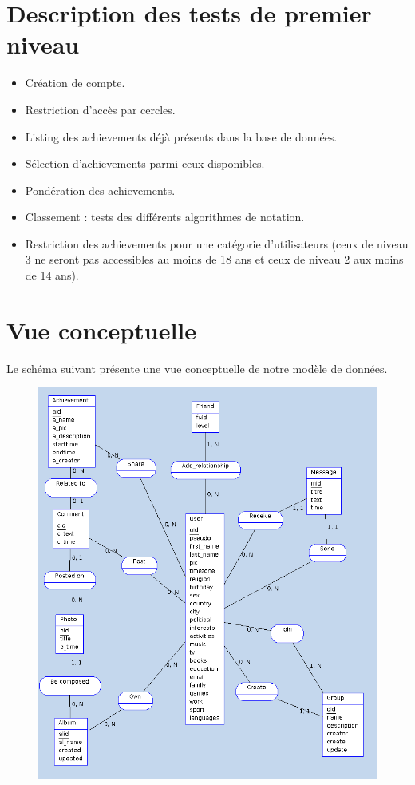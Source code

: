 \documentclass{life-fr}
\begin{document}
\section{Description des tests de premier niveau}

\begin{itemize}
  \item Création de compte.
  \item Restriction d’accès par cercles.
  \item Listing des achievements déjà présents dans la base de données.
  \item Sélection d’achievements parmi ceux disponibles.
  \item Pondération des achievements.
  \item Classement : tests des différents algorithmes de notation.
  \item Restriction des achievements pour une catégorie d’utilisateurs (ceux de niveau 3 ne seront pas accessibles au moins de 18 ans et ceux de niveau 2 aux moins de 14 ans).
\end{itemize}

\newpage

\section{Vue conceptuelle}

Le schéma suivant présente une vue conceptuelle de notre modèle de données.

\begin{figure}[H]
  \begin{center}
    \includegraphics[width=16cm]{img/vue_donnees.png}
  \end{center}
\end{figure}
\end{document}
